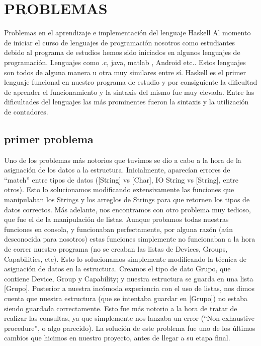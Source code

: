 \documentclass[11pt]{article} %
\begin{document}
\section{PROBLEMAS }


Problemas en el aprendizaje e implementación del lenguaje Haskell
Al momento de iniciar el curso de lenguajes de programación nosotros como estudiantes debido al programa de estudios hemos sido iniciados en algunos lenguajes de programación.  Lenguajes como .c, java, matlab , Android  etc.. Estos lenguajes son todos de alguna manera u otra muy similares entre sí. Haskell es el primer lenguaje funcional en nuestro programa de estudio y por consiguiente la dificultad de aprender el funcionamiento y la sintaxis del mismo fue muy elevada. 
Entre las dificultades del lenguajes las más prominentes fueron la sintaxis y la utilización de contadores.


\subsection{primer problema}


Uno de los problemas más notorios que tuvimos se dio a cabo a la hora de la asignación de los datos a la estructura. 
Inicialmente, aparecían errores de “match” entre tipos de datos ([String] vs [Char], IO String vs [String], entre otros). Esto lo solucionamos modificando extensivamente las funciones que manipulaban los Strings y los arreglos de Strings para que retornen los tipos de datos correctos. 
Más adelante, nos encontramos con otro problema muy tedioso, que fue el de la manipulación de listas. Aunque probamos todas nuestras funciones en consola, y funcionaban perfectamente, por alguna razón (aún desconocida para nosotros) estas funciones simplemente no funcionaban a la hora de correr nuestro programa (no se creaban las listas de Devices, Groups, Capabilities, etc). Esto lo solucionamos simplemente modificando la técnica de asignación de datos en la estructura. Creamos el tipo de dato Grupo, que contiene Device, Group y Capability; y nuestra estructura se guarda en una lista [Grupo].
Posterior a nuestra incómoda experiencia con el uso de listas, nos dimos cuenta que nuestra estructura (que se intentaba guardar en [Grupo]) no estaba siendo guardada correctamente. Esto fue más notorio a la hora de tratar de realizar las consultas, ya que simplemente nos lanzaba un error (“Non-exhaustive procedure”, o algo parecido). La solución de este problema fue uno de los últimos cambios que hicimos en nuestro proyecto, antes de llegar a su etapa final.
\end{document}
